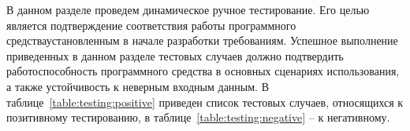 В данном разделе проведем динамическое ручное тестирование. Его целью является подтверждение соответствия работы программного средства\linebreak установленным в начале разработки требованиям. Успешное выполнение приведенных в данном разделе тестовых случаев должно подтвердить работоспособность программного средства в основных сценариях использования, а также устойчивость к неверным входным данным. В таблице~\ref{table:testing:positive} приведен список тестовых случаев, относящихся к позитивному тестированию, в таблице~\ref{table:testing:negative} -- к негативному.

\newcommand\testnumber{\stepcounter{testnumber}\arabic{testnumber}}

\renewcommand{\labelenumi}{\arabic{enumi})}
\renewcommand{\labelenumii}{\asbuk{enumii})}

